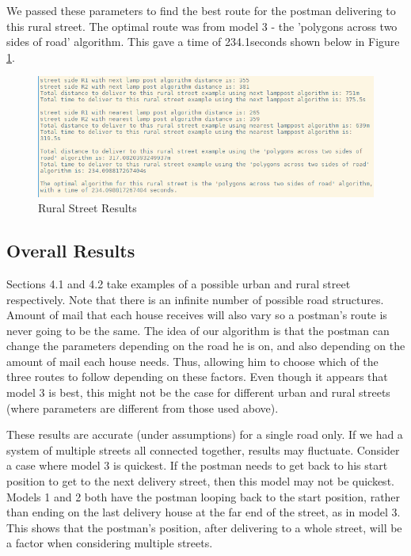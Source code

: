 \documentclass[14pt]{article}
\begin{document}
We passed these parameters to find the best route for the postman delivering to this rural street. The optimal route was from model 3 - the 'polygons across two sides of road' algorithm. This gave a time of 234.1seconds shown below in Figure \ref{fig:rural street results}. 

\begin{figure}[H]
\centering
\includegraphics[width = 430pt]{Images/RuralStreetResults.png}
\caption{Rural Street Results}
\label{fig:rural street results}
\end{figure}

\subsection{Overall Results}
Sections 4.1 and 4.2 take examples of a possible urban and rural street respectively. Note that there is an infinite number of possible road structures. Amount of mail that each house receives will also vary so a postman's route is never going to be the same. The idea of our algorithm is that the postman can change the parameters depending on the road he is on, and also depending on the amount of mail each house needs. Thus, allowing him to choose which of the three routes to follow depending on these factors. Even though it appears that model 3 is best, this might not be the case for different urban and rural streets (where parameters are different from those used above). 

These results are accurate (under assumptions) for a single road only. If we had a system of multiple streets all connected together, results may fluctuate. Consider a case where model 3 is quickest. If the postman needs to get back to his start position to get to the next delivery street, then this model may not be quickest. Models 1 and 2 both have the postman looping back to the start position, rather than ending on the last delivery house at the far end of the street, as in model 3. This shows that the postman's position, after delivering to a whole street, will be a factor when considering multiple streets. 
\end{document}

